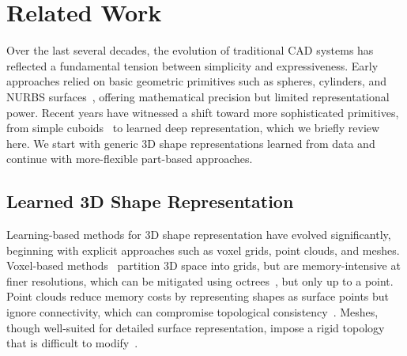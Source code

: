 
\section{Related Work}
\label{sec:related}

Over the last several decades, the evolution of traditional CAD systems has reflected a fundamental tension between simplicity and expressiveness. Early approaches relied on basic geometric primitives such as spheres, cylinders, and NURBS surfaces~\cite{Piegl91}, offering mathematical precision but limited representational power. Recent years have witnessed a shift toward more sophisticated primitives, from simple cuboids~\cite{Tulsiani17b, Niu18, Sun19b, Kluger21} to learned deep representation, which we briefly review here. We start with generic 3D shape representations learned from data and continue with more-flexible part-based approaches. 

\subsection{Learned 3D Shape Representation}

Learning-based methods for 3D shape representation have evolved significantly, beginning with explicit approaches such as voxel grids, point clouds, and meshes. Voxel-based methods~\cite{Wu15b, Wu16b, Choy16b, Dai17a} partition 3D space into grids, but are memory-intensive at finer resolutions, which can be mitigated using octrees~\cite{Riegler17, Tatarchenko17}, but only up to a point. Point clouds reduce memory costs by representing shapes as surface points but ignore connectivity, which can compromise topological consistency~\cite{Fan17a, Yang18a, Achlioptas18b, Peng21a, Zeng22}. Meshes, though well-suited for detailed surface representation, impose a rigid topology that is difficult to modify~\cite{Groueix18a, Kanazawa18b, Wang18e, Pan19}.


